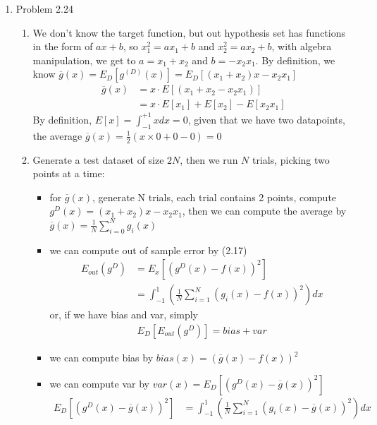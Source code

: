 \documentclass{article}
\begin{document}
\begin{enumerate}
        \item Problem 2.24
        \begin{enumerate}[label=(\alph*)]
            \item We don't know the target function, but out hypothesis set has functions in the form of $ax + b$, so $x^2_1 = ax_1 + b$ and $x^2_2 = ax_2 + b$, with algebra manipulation, we get to $a = x_1 + x_2$ and $b = -x_2x_1$. By definition, we know $\overline{g}(x) = E_D[g^{(D)}(x)] = E_D[(x_1+x_2)x - x_2x_1]$
            \begin{align*}
                    \overline{g}(x) &= x \cdot E[(x_1+x_2-x_2x_1)]\\
                    &= x \cdot E[x_1] + E[x_2] - E[x_2x_1]
            \end{align*}
            By definition, $E[x] = \int^{+1}_{-1}xdx = 0$, given that we have two datapoints, the average $\overline{g}(x) = \frac{1}{2}(x \times 0 + 0 - 0) = 0$
            
            \item Generate a test dataset of size $2N$, then we run $N$ trials, picking two points at a time:
            \begin{itemize}
                \item for $\overline{g}(x)$, generate N trials, each trial contains 2 points, compute $g^D(x) = (x_1 + x_2)x - x_2x_1$, then we can compute the average by $\overline{g}(x) = \frac{1}{N}\sum_{i = 0}^{N}g_i(x)$
                \item we can compute out of sample error by (2.17)
                \begin{align*}
                    E_{out}(g^D) &= E_x[(g^D(x) - f(x))^2]\\
                    &= \int_{-1}^{1}(\frac{1}{N}\sum_{i = 1}^{N}(g_i(x) - f(x))^2)dx
                \end{align*}
                or, if we have bias and var, simply
                \begin{align*}
                    E_D[E_{out}(g^D)] = bias + var
                \end{align*}
                \item we can compute bias by $bias(x) = (\overline{g}(x) - f(x))^2$
                \item we can compute var by $var(x) = E_D[(g^D(x) - \overline{g}(x))^2]$
                \begin{align*}
                    E_D[(g^D(x) - \overline{g}(x))^2] &= \int_{-1}^{1}(\frac{1}{N}\sum_{i = 1}^{N}(g_i(x) - \overline{g}(x))^2)dx
                \end{align*}
            \end{itemize}


\end{enumerate}
\end{enumerate}
\end{document}
